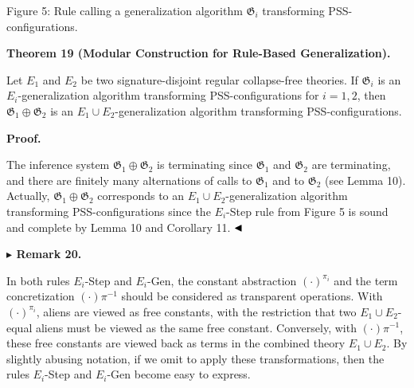 \documentclass[10pt,a4paper]{amsart}
\begin{document}
Figure 5: Rule calling a generalization algorithm $\mathfrak{G}_{i}$ transforming PSS-configurations.\par
 
 

 
\par\medskip\noindent\textbf{Theorem 19 (Modular Construction for Rule-Based Generalization).}\par
 
 
Let $E_{1}$ and $E_{2}$ be two signature-disjoint regular collapse-free theories. If $\mathfrak{G}_{i}$ is an $E_{i}$-generalization algorithm transforming PSS-configurations for $i=1,2$, then $\mathfrak{G}_{1}\oplus\mathfrak{G}_{2}$ is an $E_{1}\cup E_{2}$-generalization algorithm transforming PSS-configurations.\par
 
 

 
\par\medskip\noindent\textbf{Proof.}\par
 
 
The inference system $\mathfrak{G}_{1}\oplus\mathfrak{G}_{2}$ is terminating since $\mathfrak{G}_{1}$ and $\mathfrak{G}_{2}$ are terminating, and there are finitely many alternations of calls to $\mathfrak{G}_{1}$ and to $\mathfrak{G}_{2}$ (see Lemma 10). Actually, $\mathfrak{G}_{1}\oplus\mathfrak{G}_{2}$ corresponds to an $E_{1}\cup E_{2}$-generalization algorithm transforming PSS-configurations since the ${E_{i}}$-Step rule from Figure 5 is sound and complete by Lemma 10 and Corollary 11. $\hfill\blacktriangleleft$\par
 

 
\par\medskip\noindent\textbf{$\blacktriangleright$ Remark 20.}\par
 
 
In both rules $E_{i}$-Step and $E_{i}$-Gen, the constant abstraction $(\cdot)^{\pi_{i}}$ and the term concretization $(\cdot)\pi^{-1}$ should be considered as transparent operations. With $(\cdot)^{\pi_{i}}$, aliens are viewed as free constants, with the restriction that two $E_{1}\cup E_{2}$-equal aliens must be viewed as the same free constant. Conversely, with $(\cdot)\pi^{-1}$, these free constants are viewed back as terms in the combined theory $E_{1}\cup E_{2}$. By slightly abusing notation, if we omit to apply these transformations, then the rules $E_{i}$-Step and $E_{i}$-Gen become easy to express.\par
 
\end{document}
